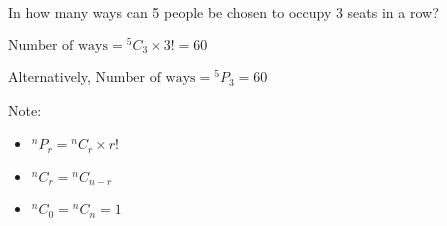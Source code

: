 \documentclass[11pt,a4paper]{book}
\begin{document}
\begin{example}

In how many ways can 5 people be chosen to occupy 3 seats in a row?

\Solution

$\text{Number of ways}={}^{5}C_{3}\times3!=60$

Alternatively, $\text{Number of ways}={}^{5}P_{3}=60$
\end{example}


Note:
\begin{itemize}
\item $^{n}P_{r}={}^{n}C_{r}\times r!$
\item $^{n}C_{r}={}^{n}C_{n-r}$
\item $^{n}C_{0}={}^{n}C_{n}=1$
\end{itemize}

\newpage
\end{document}
